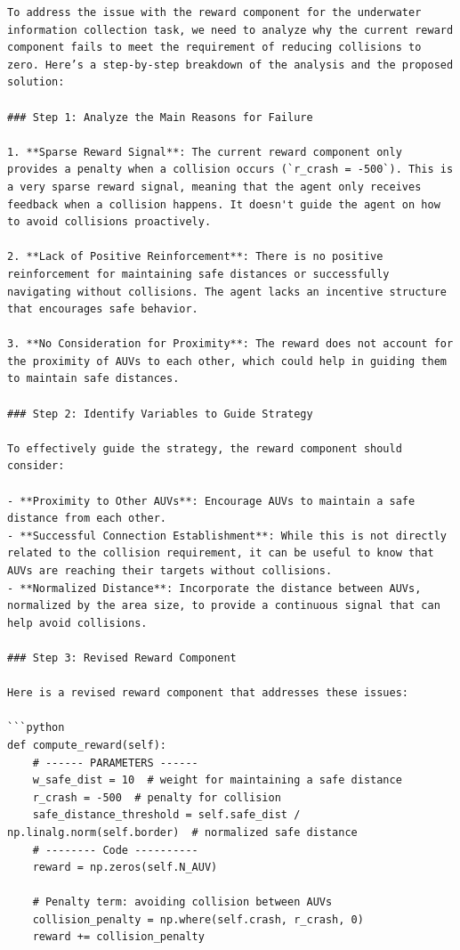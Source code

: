 \documentclass{article}
\begin{document}
\begin{verbatim}
To address the issue with the reward component for the underwater information collection task, we need to analyze why the current reward component fails to meet the requirement of reducing collisions to zero. Here’s a step-by-step breakdown of the analysis and the proposed solution:

### Step 1: Analyze the Main Reasons for Failure

1. **Sparse Reward Signal**: The current reward component only provides a penalty when a collision occurs (`r_crash = -500`). This is a very sparse reward signal, meaning that the agent only receives feedback when a collision happens. It doesn't guide the agent on how to avoid collisions proactively.

2. **Lack of Positive Reinforcement**: There is no positive reinforcement for maintaining safe distances or successfully navigating without collisions. The agent lacks an incentive structure that encourages safe behavior.

3. **No Consideration for Proximity**: The reward does not account for the proximity of AUVs to each other, which could help in guiding them to maintain safe distances.

### Step 2: Identify Variables to Guide Strategy

To effectively guide the strategy, the reward component should consider:

- **Proximity to Other AUVs**: Encourage AUVs to maintain a safe distance from each other.
- **Successful Connection Establishment**: While this is not directly related to the collision requirement, it can be useful to know that AUVs are reaching their targets without collisions.
- **Normalized Distance**: Incorporate the distance between AUVs, normalized by the area size, to provide a continuous signal that can help avoid collisions.

### Step 3: Revised Reward Component

Here is a revised reward component that addresses these issues:

```python
def compute_reward(self):
    # ------ PARAMETERS ------
    w_safe_dist = 10  # weight for maintaining a safe distance
    r_crash = -500  # penalty for collision
    safe_distance_threshold = self.safe_dist / np.linalg.norm(self.border)  # normalized safe distance
    # -------- Code ----------
    reward = np.zeros(self.N_AUV)

    # Penalty term: avoiding collision between AUVs
    collision_penalty = np.where(self.crash, r_crash, 0)
    reward += collision_penalty


\end{verbatim}
\end{document}

